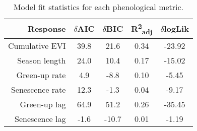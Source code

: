 \begin{table}[H]
\centering
\begin{tabular}{rcccc}
  \hline
Response & $\delta$AIC & $\delta$BIC & R\textsuperscript{2}\textsubscript{adj} & $\delta$logLik \\ 
  \hline
Cumulative EVI & 39.8 & 21.6 & 0.34 & -23.92 \\ 
  Season length & 24.0 & 10.4 & 0.17 & -15.02 \\ 
  Green-up rate & 4.9 & -8.8 & 0.10 & -5.45 \\ 
  Senescence rate & 12.3 & -1.3 & 0.04 & -9.17 \\ 
  Green-up lag & 64.9 & 51.2 & 0.26 & -35.45 \\ 
  Senescence lag & -1.6 & -10.7 & 0.01 & -1.19 \\ 
   \hline
\end{tabular}
\caption{Model fit statistics for each phenological metric.} 
\label{mod_stat}
\end{table}


